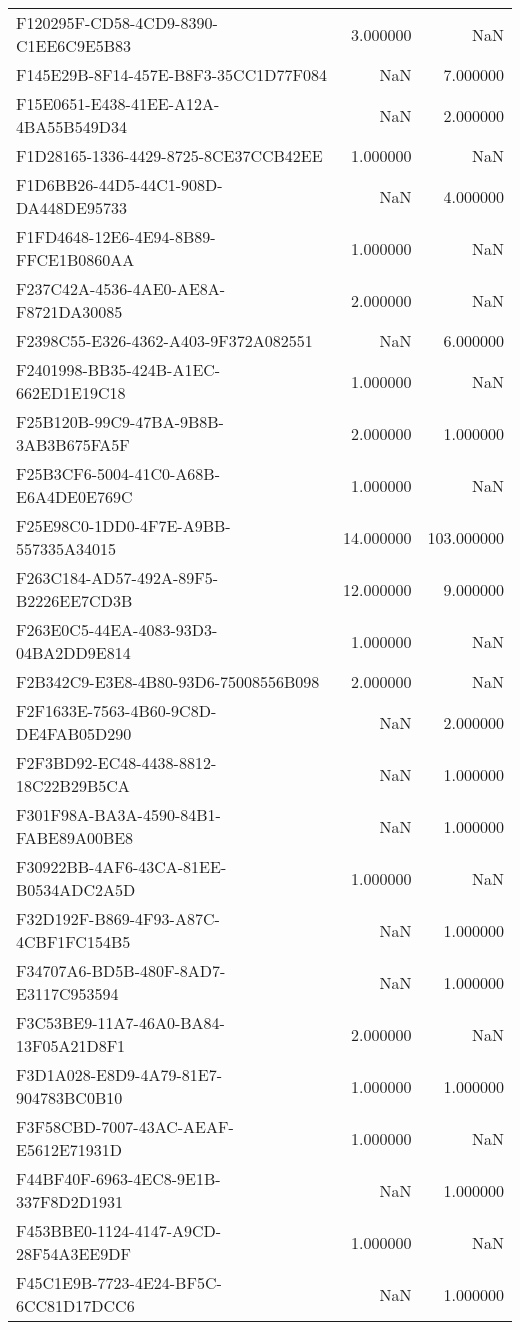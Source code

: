 \begin{tabular}{lrr}
F120295F-CD58-4CD9-8390-C1EE6C9E5B83 & 3.000000 & NaN \\
F145E29B-8F14-457E-B8F3-35CC1D77F084 & NaN & 7.000000 \\
F15E0651-E438-41EE-A12A-4BA55B549D34 & NaN & 2.000000 \\
F1D28165-1336-4429-8725-8CE37CCB42EE & 1.000000 & NaN \\
F1D6BB26-44D5-44C1-908D-DA448DE95733 & NaN & 4.000000 \\
F1FD4648-12E6-4E94-8B89-FFCE1B0860AA & 1.000000 & NaN \\
F237C42A-4536-4AE0-AE8A-F8721DA30085 & 2.000000 & NaN \\
F2398C55-E326-4362-A403-9F372A082551 & NaN & 6.000000 \\
F2401998-BB35-424B-A1EC-662ED1E19C18 & 1.000000 & NaN \\
F25B120B-99C9-47BA-9B8B-3AB3B675FA5F & 2.000000 & 1.000000 \\
F25B3CF6-5004-41C0-A68B-E6A4DE0E769C & 1.000000 & NaN \\
F25E98C0-1DD0-4F7E-A9BB-557335A34015 & 14.000000 & 103.000000 \\
F263C184-AD57-492A-89F5-B2226EE7CD3B & 12.000000 & 9.000000 \\
F263E0C5-44EA-4083-93D3-04BA2DD9E814 & 1.000000 & NaN \\
F2B342C9-E3E8-4B80-93D6-75008556B098 & 2.000000 & NaN \\
F2F1633E-7563-4B60-9C8D-DE4FAB05D290 & NaN & 2.000000 \\
F2F3BD92-EC48-4438-8812-18C22B29B5CA & NaN & 1.000000 \\
F301F98A-BA3A-4590-84B1-FABE89A00BE8 & NaN & 1.000000 \\
F30922BB-4AF6-43CA-81EE-B0534ADC2A5D & 1.000000 & NaN \\
F32D192F-B869-4F93-A87C-4CBF1FC154B5 & NaN & 1.000000 \\
F34707A6-BD5B-480F-8AD7-E3117C953594 & NaN & 1.000000 \\
F3C53BE9-11A7-46A0-BA84-13F05A21D8F1 & 2.000000 & NaN \\
F3D1A028-E8D9-4A79-81E7-904783BC0B10 & 1.000000 & 1.000000 \\
F3F58CBD-7007-43AC-AEAF-E5612E71931D & 1.000000 & NaN \\
F44BF40F-6963-4EC8-9E1B-337F8D2D1931 & NaN & 1.000000 \\
F453BBE0-1124-4147-A9CD-28F54A3EE9DF & 1.000000 & NaN \\
F45C1E9B-7723-4E24-BF5C-6CC81D17DCC6 & NaN & 1.000000 \\

\end{tabular}
